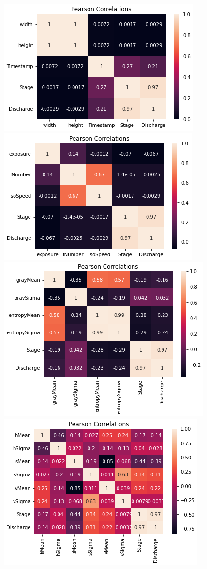 \documentclass{article}
\begin{document}
        \begin{center}
            \includegraphics{images/Corr_pearson1.PNG} 
            \includegraphics{images/Corr_pearson2.PNG} 
            \includegraphics{images/Corr_pearson3.PNG} 
            \includegraphics{images/Corr_pearson4.PNG} 

\end{center}
\end{document}
